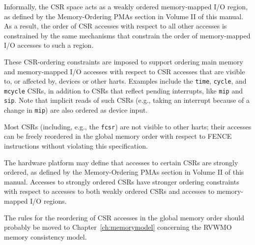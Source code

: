 \begin{commentary}
Informally, the CSR space acts as a weakly ordered memory-mapped I/O region, as
defined by the Memory-Ordering PMAs section in Volume II of this manual. As a
result, the order of CSR accesses with respect to all other accesses is
constrained by the same mechanisms that constrain the order of memory-mapped
I/O accesses to such a region.

These CSR-ordering constraints are imposed to support ordering main
memory and memory-mapped I/O accesses with respect to CSR accesses that
are visible to, or affected by, devices or other harts.
Examples include the {\tt time}, {\tt cycle}, and {\tt mcycle}
CSRs, in addition to CSRs that reflect pending interrupts, like {\tt mip} and
{\tt sip}.
Note that implicit reads of such CSRs (e.g., taking an interrupt because of
a change in {\tt mip}) are also ordered as device input.

Most CSRs (including, e.g., the {\tt fcsr}) are not visible to other harts;
their accesses can be freely reordered in the global memory order with respect
to FENCE instructions without violating this specification.
\end{commentary}

The hardware platform may define that accesses to certain CSRs are
strongly ordered, as defined by the Memory-Ordering PMAs section in Volume II
of this manual. Accesses to strongly ordered CSRs have stronger ordering
constraints with respect to accesses to both weakly ordered CSRs and accesses
to memory-mapped I/O regions.

\begin{commentary}
The rules for the reordering of CSR accesses in the global memory order
should probably be moved to Chapter~\ref{ch:memorymodel} concerning the
RVWMO memory consistency model.
\end{commentary}
